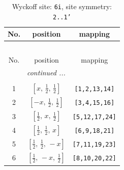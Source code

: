 \documentclass[fleqn,8pt]{jsarticle}
\begin{document}
\renewcommand{\arraystretch}{1.2}
\begin{longtable}{ccc}
\caption{Wyckoff site: {\tt 6i}, site symmetry: {\tt 2..1'}}
 \\
 \hline \hline
No. & position & mapping \\ \hline \endfirsthead

\multicolumn{2}{l}{\tablename\ \thetable{}} \\
 \hline \hline
No. & position & mapping \\ \hline \endhead

 \hline \hline
\multicolumn{2}{r}{\footnotesize\it continued ...} \\ \endfoot

 \hline \hline
\multicolumn{2}{r}{} \\ \endlastfoot

1 & $\left[ x,\, \frac{1}{2},\, \frac{1}{2} \right]$ & {\tt [1,2,13,14]} \\ \hline
2 & $\left[ - x,\, \frac{1}{2},\, \frac{1}{2} \right]$ & {\tt [3,4,15,16]} \\ \hline
3 & $\left[ \frac{1}{2},\, x,\, \frac{1}{2} \right]$ & {\tt [5,12,17,24]} \\ \hline
4 & $\left[ \frac{1}{2},\, \frac{1}{2},\, x \right]$ & {\tt [6,9,18,21]} \\ \hline
5 & $\left[ \frac{1}{2},\, \frac{1}{2},\, - x \right]$ & {\tt [7,11,19,23]} \\ \hline
6 & $\left[ \frac{1}{2},\, - x,\, \frac{1}{2} \right]$ & {\tt [8,10,20,22]} \\
\end{longtable}
\renewcommand{\arraystretch}{1.2}
\end{document}
